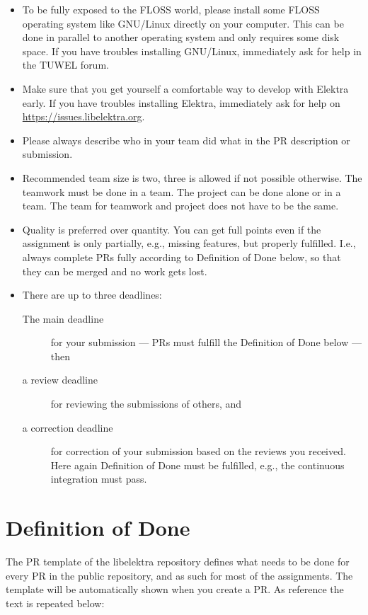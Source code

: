 \documentclass[11pt,a4paper]{article}
\begin{document}
\begin{itemize}
\item To be fully exposed to the FLOSS world, please install some FLOSS operating system like GNU/Linux directly on your computer.
	This can be done in parallel to another operating system and only requires some disk space.
	If you have troubles installing GNU/Linux, immediately ask for help in the TUWEL forum.
\item Make sure that you get yourself a comfortable way to develop with Elektra early.
	If you have troubles installing Elektra, immediately ask for help on \url{https://issues.libelektra.org}.
\item Please always describe who in your team did what in the PR description or submission.
\item Recommended team size is two, three is allowed if not possible otherwise.
	The teamwork must be done in a team.
	The project can be done alone or in a team.
	The team for teamwork and project does not have to be the same.
\item Quality is preferred over quantity.
	You can get full points even if the assignment is only partially, e.g., missing features, but properly fulfilled.
	I.e., always complete PRs fully according to Definition of Done below, so that they can be merged and no work gets lost.
\item There are up to three deadlines:
	\begin{description}
	\item[The main deadline] for your submission --- PRs must fulfill the Definition of Done below --- then
	\item[a review deadline] for reviewing the submissions of others, and
	\item[a correction deadline] for correction of your submission based on the reviews you received.
		Here again Definition of Done must be fulfilled, e.g., the continuous integration must pass.
	\end{description}
\end{itemize}


\renewcommand{\thesection}{}
\section{Definition of Done}

The PR template of the libelektra repository defines what needs to be done for every PR in the public repository, and as such for most of the assignments.
The template will be automatically shown when you create a PR.
As reference the text is repeated below:
\end{document}
